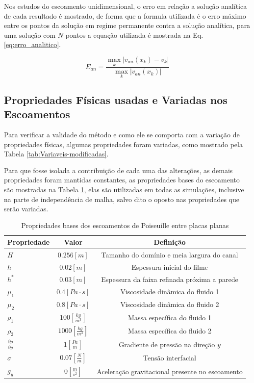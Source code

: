 Nos estudos do escoamento unidimensional, o erro em relação a solução analítica de cada resultado é mostrado, de forma que a formula utilizada é o erro máximo entre os pontos da solução em regime permanente contra a solução analítica, para uma solução com $N$ pontos a equação utilizada é mostrada na Eq. \ref{eq:erro_analitico}.

\begin{equation}
    E_{an} = \frac{\max_k \left| v_{an}(x_k) - v_k \right|}{\max_k \left| v_{an}(x_k) \right|}
    \label{eq:erro_analitico}
\end{equation}

\subsection{Propriedades Físicas usadas e Variadas nos Escoamentos}

Para verificar a validade do método e como ele se comporta com a variação de propriedades físicas, algumas propriedades foram variadas, como mostrado pela Tabela \ref{tab:Variaveis-modificadas}.

 
Para que fosse isolada a contribuição de cada uma das alterações, as demais propriedades foram mantidas constantes, as propriedades bases do escoamento são mostradas na Tabela \ref{tab:propriedades-base}, elas são utilizadas em todas as simulações, inclusive na parte de independência de malha, salvo dito o oposto nas propriedades que serão variadas.

\begin{table}
    \centering
    \caption{Propriedades bases dos escoamentos de Poiseuille entre placas planas}
    \label{tab:propriedades-base}
    \begin{tabular}{@{}l cc@{}}
        \toprule
        Propriedade     & Valor         & Definição \\
        \midrule
        $H$             & $0.256 [m]$           & Tamanho do domínio e meia largura do canal \\
        $h$             & $0.02  [m]$           & Espessura inicial do filme \\
        $h^*$           & $0.03  [m]$           & Espessura da faixa refinada próxima a parede \\
        $\mu_1$         & $0.4 [Pa \cdot s]$ & Viscosidade dinâmica do fluido 1 \\
        $\mu_2$         & $0.8 [Pa \cdot s]$ & Viscosidade dinâmica do fluido 2 \\
        $\rho_1$        & $100 [\frac{kg}{m^3}]$& Massa específica do fluido 1 \\
        $\rho_2$        & $1000[\frac{kg}{m^3}]$& Massa específica do fluido 2 \\
        $\frac{\partial p}{\partial y}$ & $1 [\frac{Pa}{m}]$    & Gradiente de pressão na direção $y$\\
        $\sigma$        & $0.07 [\frac{N}{m}]$    & Tensão interfacial \\
        $g_y$             & $0 [\frac{m}{s^2}]$    & Aceleração gravitacional presente no escoamento \\
        \bottomrule
    \end{tabular}
\end{table}

